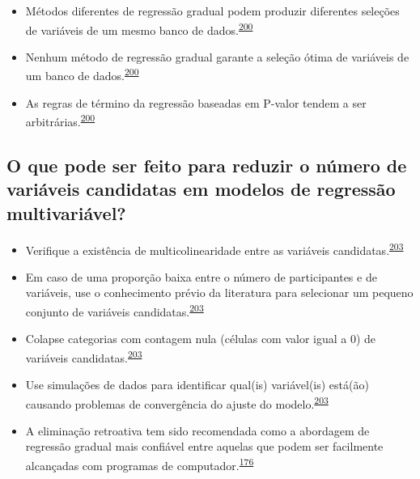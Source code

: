 \documentclass[
  a4paper,
]{book}
\begin{document}
\begin{itemize}
\item
  Métodos diferentes de regressão gradual podem produzir diferentes seleções de variáveis de um mesmo banco de dados.\textsuperscript{\protect\hyperlink{ref-Healy1995}{200}}
\item
  Nenhum método de regressão gradual garante a seleção ótima de variáveis de um banco de dados.\textsuperscript{\protect\hyperlink{ref-Healy1995}{200}}
\item
  As regras de término da regressão baseadas em P-valor tendem a ser arbitrárias.\textsuperscript{\protect\hyperlink{ref-Healy1995}{200}}
\end{itemize}

\hypertarget{o-que-pode-ser-feito-para-reduzir-o-nuxfamero-de-variuxe1veis-candidatas-em-modelos-de-regressuxe3o-multivariuxe1vel}{%
\subsection{O que pode ser feito para reduzir o número de variáveis candidatas em modelos de regressão multivariável?}\label{o-que-pode-ser-feito-para-reduzir-o-nuxfamero-de-variuxe1veis-candidatas-em-modelos-de-regressuxe3o-multivariuxe1vel}}

\begin{itemize}
\item
  Verifique a existência de multicolinearidade entre as variáveis candidatas.\textsuperscript{\protect\hyperlink{ref-Sun1996}{203}}
\item
  Em caso de uma proporção baixa entre o número de participantes e de variáveis, use o conhecimento prévio da literatura para selecionar um pequeno conjunto de variáveis candidatas.\textsuperscript{\protect\hyperlink{ref-Sun1996}{203}}
\item
  Colapse categorias com contagem nula (células com valor igual a 0) de variáveis candidatas.\textsuperscript{\protect\hyperlink{ref-Sun1996}{203}}
\item
  Use simulações de dados para identificar qual(is) variável(is) está(ão) causando problemas de convergência do ajuste do modelo.\textsuperscript{\protect\hyperlink{ref-Sun1996}{203}}
\item
  A eliminação retroativa tem sido recomendada como a abordagem de regressão gradual mais confiável entre aquelas que podem ser facilmente alcançadas com programas de computador.\textsuperscript{\protect\hyperlink{ref-heinze2016}{176}}
\end{itemize}
\end{document}

